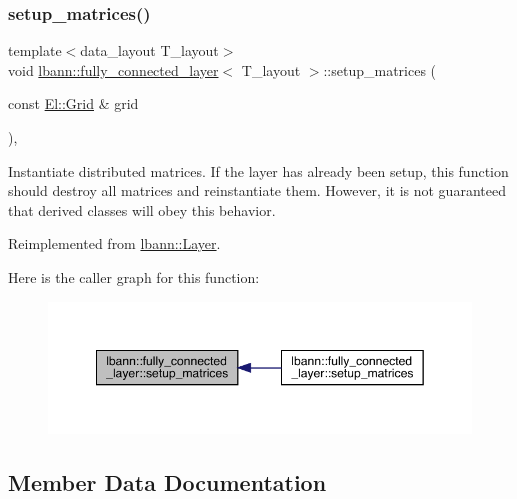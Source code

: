 \subsubsection{\texorpdfstring{setup\+\_\+matrices()}{setup\_matrices()}\hspace{0.1cm}{\footnotesize\ttfamily [3/3]}}
{\footnotesize\ttfamily template$<$data\+\_\+layout T\+\_\+layout$>$ \\
void \hyperlink{classlbann_1_1fully__connected__layer}{lbann\+::fully\+\_\+connected\+\_\+layer}$<$ T\+\_\+layout $>$\+::setup\+\_\+matrices (\begin{DoxyParamCaption}\item[{const \hyperlink{base_8hpp_a9951bb1719d534e0401b1f06cad19eab}{El\+::\+Grid} \&}]{grid }\end{DoxyParamCaption})\hspace{0.3cm}{\ttfamily [override]}, {\ttfamily [virtual]}}

Instantiate distributed matrices. If the layer has already been setup, this function should destroy all matrices and reinstantiate them. However, it is not guaranteed that derived classes will obey this behavior. 

Reimplemented from \hyperlink{classlbann_1_1Layer_a57bbe21131dc00ab5cf9ea5e3656808e}{lbann\+::\+Layer}.

Here is the caller graph for this function\+:\nopagebreak
\begin{figure}[H]
\begin{center}
\leavevmode
\includegraphics[width=349pt]{classlbann_1_1fully__connected__layer_a4f26e5923a82f11c2c7658a27903f83b_icgraph}
\end{center}
\end{figure}


\subsection{Member Data Documentation}
\mbox{\label{classlbann_1_1fully__connected__layer_a6510917c573378f40789a1d16db22b4e}} 
